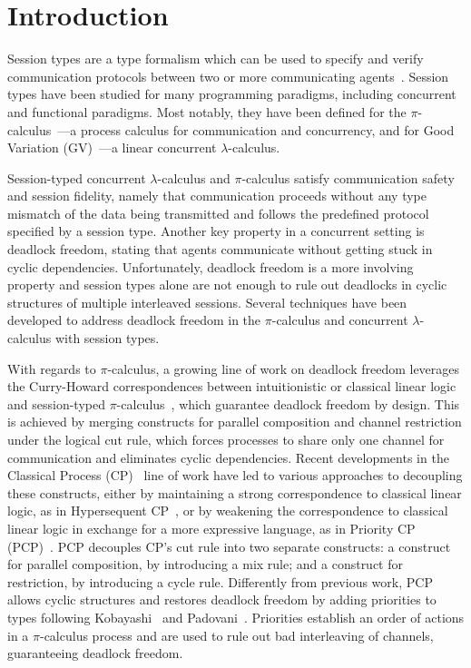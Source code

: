 \documentclass[main.tex]{subfiles}
\begin{document}
\section{Introduction}
Session types are a type formalism which can be used to specify and verify communication protocols between two or more communicating agents~\cite{honda93,takeuchihonda94,hondavasconcelos98,carbonehonda07}.
Session types have been studied for many programming paradigms, including concurrent and functional paradigms. Most notably, they have been defined for the $\pi$-calculus~\cite{sangiorgiwalker01}---a process calculus for communication and concurrency, and for Good Variation (GV)~\cite{wadler15,lindleymorris15}---a linear concurrent $\lambda$-calculus.

Session-typed concurrent $\lambda$-calculus and $\pi$-calculus satisfy communication safety and session fidelity, namely that communication proceeds without any type mismatch of the data being transmitted and follows the predefined protocol specified by a session type.
Another key property in a concurrent setting is deadlock freedom, stating that agents communicate without getting stuck in cyclic dependencies. Unfortunately, deadlock freedom is a more involving property and session types alone are not enough to rule out deadlocks in cyclic structures of multiple interleaved sessions. Several techniques have been developed to address deadlock freedom in the $\pi$-calculus and concurrent $\lambda$-calculus with session types.

With regards to $\pi$-calculus, a growing line of work on deadlock freedom leverages the Curry-Howard correspondences between intuitionistic or classical linear logic and session-typed $\pi$-calculus~\cite{cairespfenning10,wadler12}, which guarantee deadlock freedom by design. This is achieved by merging constructs for parallel composition and channel restriction under the logical cut rule, which forces processes to share only one channel for communication and eliminates cyclic dependencies. Recent developments in the Classical Process (CP)~\cite{wadler14} line of work have led to various approaches to decoupling these constructs, either by maintaining a strong correspondence to classical linear logic, as in Hypersequent CP~\cite{kokkemontesi19popl,kokkemontesi19tlla}, or by weakening the correspondence to classical linear logic in exchange for a more expressive language, as in Priority CP (PCP)~\cite{dardhagay18}. PCP decouples CP's cut rule into two separate constructs: a construct for parallel composition, by introducing a mix rule; and a construct for restriction, by introducing a cycle rule. Differently from previous work, PCP allows cyclic structures and restores deadlock freedom by adding priorities to types following Kobayashi~\cite{kobayashi06} and Padovani~\cite{padovani14}. Priorities establish an order of actions in a $\pi$-calculus process and are used to rule out bad interleaving of channels, guaranteeing deadlock freedom.
\end{document}
